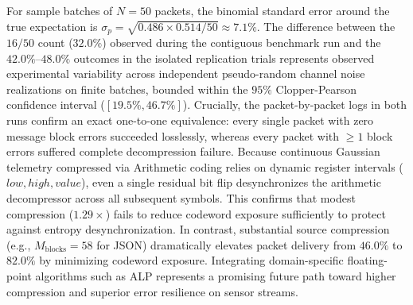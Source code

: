 \documentclass[conference]{IEEEtran}
\begin{document}
For sample batches of $N=50$ packets, the binomial standard error around the true expectation is $\sigma_p = \sqrt{0.486 \times 0.514 / 50} \approx 7.1\%$. The difference between the $16/50$ count ($32.0\%$) observed during the contiguous benchmark run and the $42.0\%$--$48.0\%$ outcomes in the isolated replication trials represents observed experimental variability across independent pseudo-random channel noise realizations on finite batches, bounded within the $95\%$ Clopper-Pearson confidence interval ($[19.5\%, 46.7\%]$). Crucially, the packet-by-packet logs in both runs confirm an exact one-to-one equivalence: every single packet with zero message block errors succeeded losslessly, whereas every packet with $\ge 1$ block errors suffered complete decompression failure. Because continuous Gaussian telemetry compressed via Arithmetic coding relies on dynamic register intervals ($low, high, value$), even a single residual bit flip desynchronizes the arithmetic decompressor across all subsequent symbols. This confirms that modest compression ($1.29\times$) fails to reduce codeword exposure sufficiently to protect against entropy desynchronization. In contrast, substantial source compression (e.g., $M_{\text{blocks}} = 58$ for JSON) dramatically elevates packet delivery from $46.0\%$ to $82.0\%$ by minimizing codeword exposure. Integrating domain-specific floating-point algorithms such as ALP \cite{lang2024} represents a promising future path toward higher compression and superior error resilience on sensor streams.
\end{document}
